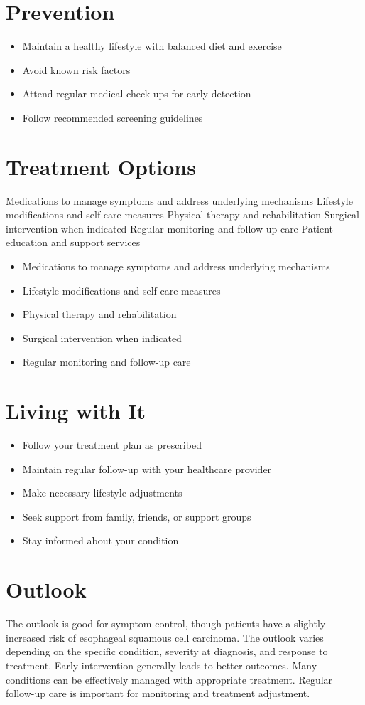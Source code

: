 \section{Prevention}
\begin{itemize}[noitemsep]
  \item Maintain a healthy lifestyle with balanced diet and exercise
  \item Avoid known risk factors
  \item Attend regular medical check-ups for early detection
  \item Follow recommended screening guidelines
\end{itemize}
\section{Treatment Options}
Medications to manage symptoms and address underlying mechanisms Lifestyle modifications and self-care measures Physical therapy and rehabilitation Surgical intervention when indicated Regular monitoring and follow-up care Patient education and support services

\begin{itemize}[noitemsep]
  \item Medications to manage symptoms and address underlying mechanisms
  \item Lifestyle modifications and self-care measures
  \item Physical therapy and rehabilitation
  \item Surgical intervention when indicated
  \item Regular monitoring and follow-up care
\end{itemize}
\section{Living with It}
\begin{itemize}[noitemsep]
  \item Follow your treatment plan as prescribed
  \item Maintain regular follow-up with your healthcare provider
  \item Make necessary lifestyle adjustments
  \item Seek support from family, friends, or support groups
  \item Stay informed about your condition
\end{itemize}
\section{Outlook}
The outlook is good for symptom control, though patients have a slightly increased risk of esophageal squamous cell carcinoma. The outlook varies depending on the specific condition, severity at diagnosis, and response to treatment. Early intervention generally leads to better outcomes. Many conditions can be effectively managed with appropriate treatment. Regular follow-up care is important for monitoring and treatment adjustment.
